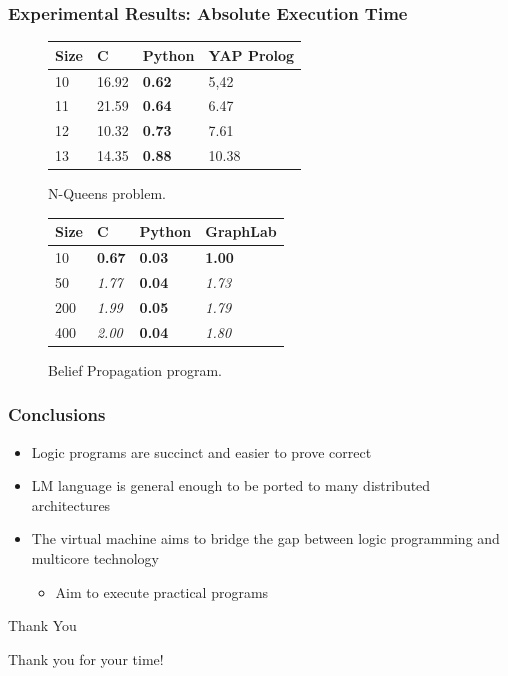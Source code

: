 \documentclass{beamer}
\begin{document}
\begin{frame}[fragile]
   \frametitle{Experimental Results: Absolute Execution Time}
   \begin{figure}[b]
      \begin{tabular}{ | l | l | l | l |}
       \hline
       Size & C & Python & YAP Prolog \\ \hline\hline
       10 & 16.92 & \textbf{0.62} & 5,42 \\
       11 & 21.59 & \textbf{0.64} & 6.47 \\
       12 & 10.32 & \textbf{0.73} & 7.61 \\
       13 & 14.35 & \textbf{0.88} & 10.38 \\
       \hline
       \end{tabular}
       \caption{N-Queens problem.}
    \end{figure}
    \begin{figure}[b]
       \begin{tabular}{ | l | l | l | l |}
        \hline

        Size & C & Python & GraphLab \\ \hline\hline
        10 & \textbf{0.67} & \textbf{0.03} & \textbf{1.00} \\
        50 & \textit{1.77} & \textbf{0.04} & \textit{1.73} \\
        200 & \textit{1.99} & \textbf{0.05} & \textit{1.79} \\
        400 & \textit{2.00} & \textbf{0.04} & \textit{1.80} \\
        \hline
        \end{tabular}
        \caption{Belief Propagation program.}
    \end{figure}
\end{frame}

\begin{frame}
   \frametitle{Conclusions}
   \begin{itemize}
      \item Logic programs are succinct and easier to prove correct
      \item LM language is general enough to be ported to many distributed architectures
      \item The virtual machine aims to bridge the gap between logic programming and multicore technology
      \begin{itemize}
         \item Aim to execute practical programs
      \end{itemize}
   \end{itemize}
\end{frame}


\begin{frame}{Thank You}
\begin{center}
{\Huge Thank you for your time!}
\end{center}
\end{frame}
\end{document}
